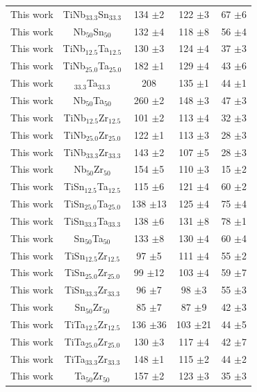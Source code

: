 \begin{longtable}[H]{ c c c c c}
	This work & TiNb$_{33.3}$Sn$_{33.3}$ & 134 $\pm$2 & 122 $\pm$3 & 67 $\pm$6 \\
	This work & Nb$_{50}$Sn$_{50}$ & 132 $\pm$4 & 118 $\pm$8 & 56 $\pm$4 \\
	This work & TiNb$_{12.5}$Ta$_{12.5}$ & 130 $\pm$3 & 124 $\pm$4 & 37 $\pm$3 \\
	This work & TiNb$_{25.0}$Ta$_{25.0}$ & 182 $\pm$1 & 129 $\pm$4 & 43 $\pm$6 \\
	This work & $_{33.3}$Ta$_{33.3}$ & 208 & 135 $\pm$1 & 44 $\pm$1 \\
	This work & Nb$_{50}$Ta$_{50}$ & 260 $\pm$2 & 148 $\pm$3 & 47 $\pm$3 \\
	This work & TiNb$_{12.5}$Zr$_{12.5}$ & 101 $\pm$2 & 113 $\pm$4 & 32 $\pm$3\\
	This work & TiNb$_{25.0}$Zr$_{25.0}$ & 122 $\pm$1 & 113 $\pm$3 & 28 $\pm$3 \\
	This work & TiNb$_{33.3}$Zr$_{33.3}$ & 143 $\pm$2 & 107 $\pm$5 & 28 $\pm$3 \\
	This work & Nb$_{50}$Zr$_{50}$ & 154 $\pm$5 & 110 $\pm$3 & 15 $\pm$2 \\
	This work & TiSn$_{12.5}$Ta$_{12.5}$ & 115 $\pm$6 & 121 $\pm$4 & 60 $\pm$2 \\
	This work & TiSn$_{25.0}$Ta$_{25.0}$ & 138 $\pm$13 & 125 $\pm$4 & 75 $\pm$4 \\
	This work & TiSn$_{33.3}$Ta$_{33.3}$ & 138 $\pm$6 & 131 $\pm$8 & 78 $\pm$1 \\
	This work & Sn$_{50}$Ta$_{50}$ & 133 $\pm$8 & 130 $\pm$4 & 60 $\pm$4 \\
	This work & TiSn$_{12.5}$Zr$_{12.5}$ & 97 $\pm$5 & 111 $\pm$4 & 55 $\pm$2 \\
	This work & TiSn$_{25.0}$Zr$_{25.0}$ & 99 $\pm$12 & 103 $\pm$4 & 59 $\pm$7 \\
	This work & TiSn$_{33.3}$Zr$_{33.3}$ & 96 $\pm$7 & 98 $\pm$3 & 55 $\pm$3 \\
	This work & Sn$_{50}$Zr$_{50}$ & 85 $\pm$7 & 87 $\pm$9 & 42 $\pm$3 \\
	This work & TiTa$_{12.5}$Zr$_{12.5}$ & 136 $\pm$36 & 103 $\pm$21 & 44 $\pm$5 \\
	This work & TiTa$_{25.0}$Zr$_{25.0}$ & 130 $\pm$3 & 117 $\pm$4 & 42 $\pm$7 \\
	This work & TiTa$_{33.3}$Zr$_{33.3}$ & 148 $\pm$1 & 115 $\pm$2 & 44 $\pm$2 \\
	This work & Ta$_{50}$Zr$_{50}$ & 157 $\pm$2 & 123 $\pm$3 & 35 $\pm$3 \\
	\hline
\end{longtable}

